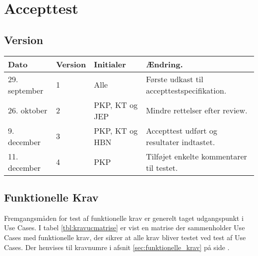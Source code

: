 \chapter{Accepttest} \label{ch:Accepttest}
\section*{Version}
\begin{table}[h]
	\centering
	\begin{tabularx}{\textwidth - 2cm}{|l|l|l|X|}
	\hline
	Dato			& Version			& Initialer 		& Ændring.									\\ \hline
	29. september 	& 1 				& Alle				& Første udkast til accepttestspecifikation.\\ \hline
	26. oktober		& 2 				& PKP, KT og JEP	& Mindre rettelser efter review.			\\ \hline
	9. december		& 3 				& PKP, KT og HBN	& Accepttest udført og resultater indtastet.\\ \hline
	11. december	& 4 				& PKP 				& Tilføjet enkelte kommentarer til testet.	\\ \hline
	\end{tabularx}
\end{table}
\clearpage

\section{Funktionelle Krav}

Fremgangsmåden for test af funktionelle krav er generelt taget udgangspunkt i Use Cases. I tabel \ref{tbl:kravucmatrise} er vist en matrise der sammenholder Use Cases med funktionelle krav, der sikrer at alle krav bliver testet ved test af Use Cases. Der henvises til kravnumre i afsnit \ref{sec:funktionelle_krav} på side \pageref{sec:funktionelle_krav}.

